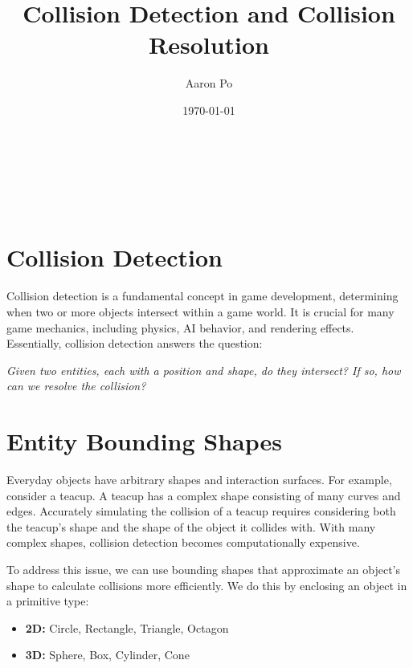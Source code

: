 \documentclass{article}
\author{Aaron Po}
\title{Collision Detection and Collision Resolution}
\date{\today}
\makeatletter
\renewcommand\maketitle{
    \begin{center}
        {\textbf{\LARGE{\@title}}} \\
        \vspace{1em}
        {\textbf{\Large{\@author}}} \\
        \vspace{1em}
        {\textbf{\large{\@date}}} \\
        \vspace{2em}
    \end{center}
}
\makeatother
\begin{document}
\maketitle


\tableofcontents

\newpage
\section{Collision Detection}
Collision detection is a fundamental concept in game development, determining
when two or more objects intersect within a game world. It is crucial for many
game mechanics, including physics, AI behavior, and rendering effects.
Essentially, collision detection answers the question:

\begin{displayquote}
    \textit{Given two entities, each with a position and shape, do they intersect? If so,
        how can we resolve the collision?}
\end{displayquote}

\section{Entity Bounding Shapes}
Everyday objects have arbitrary shapes and interaction surfaces. For example,
consider a teacup. A teacup has a complex shape consisting of many curves and
edges. Accurately simulating the collision of a teacup requires considering
both the teacup's shape and the shape of the object it collides with. With many
complex shapes, collision detection becomes computationally expensive.

To address this issue, we can use bounding shapes that approximate an object's
shape to calculate collisions more efficiently. We do this by enclosing an
object in a primitive type:
\begin{itemize}
    \item \textbf{2D:} Circle, Rectangle, Triangle, Octagon
    \item \textbf{3D:} Sphere, Box, Cylinder, Cone
\end{itemize}
\end{document}
